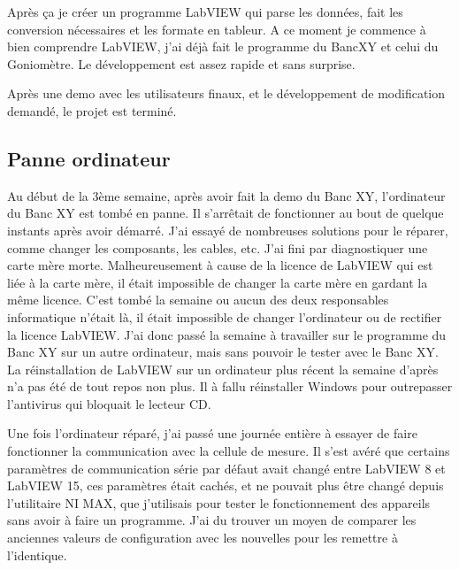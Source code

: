 \documentclass[12pt]{article}
\begin{document}
Après ça je créer un programme LabVIEW qui parse les données, fait les conversion nécessaires et les formate en tableur.
A ce moment je commence à bien comprendre LabVIEW, j'ai déjà fait le programme du BancXY et celui du Goniomètre.
Le développement est assez rapide et sans surprise.

Après une demo avec les utilisateurs finaux, et le développement de modification demandé, le projet est terminé.  

\subsection{ Panne ordinateur }

Au début de la 3ème semaine, après avoir fait la demo du Banc XY, l'ordinateur du Banc XY est tombé en panne.
Il s'arrêtait de fonctionner au bout de quelque instants après avoir démarré.
J'ai essayé de nombreuses solutions pour le réparer, comme changer les composants, les cables, etc.
J'ai fini par diagnostiquer une carte mère morte.
Malheureusement à cause de la licence de LabVIEW qui est liée à la carte mère, il était impossible de changer la carte mère en gardant la même licence.
C'est tombé la semaine ou aucun des deux responsables informatique n'était là, il était impossible de changer l'ordinateur ou de rectifier la licence LabVIEW.  
J'ai donc passé la semaine à travailler sur le programme du Banc XY sur un autre ordinateur, mais sans pouvoir le tester avec le Banc XY.  
La réinstallation de LabVIEW sur un ordinateur plus récent la semaine d'après n'a pas été de tout repos non plus.
Il à fallu réinstaller Windows pour outrepasser l'antivirus qui bloquait le lecteur CD.  

Une fois l'ordinateur réparé, j'ai passé une journée entière à essayer de faire fonctionner la communication avec la cellule de mesure.
Il s'est avéré que certains paramètres de communication série par défaut avait changé entre LabVIEW 8 et LabVIEW 15, ces paramètres était cachés, et ne pouvait plus être changé depuis l'utilitaire NI MAX, que j'utilisais pour tester le fonctionnement des appareils sans avoir à faire un programme.
J'ai du trouver un moyen de comparer les anciennes valeurs de configuration avec les nouvelles pour les remettre à l'identique.








		
\end{document}
